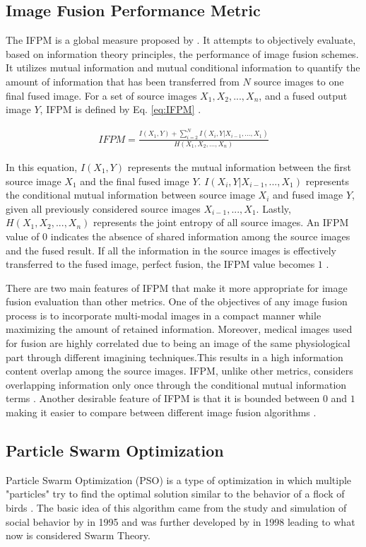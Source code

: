 \documentclass{article}
\begin{document}
\subsection{Image Fusion Performance Metric}
\label{subsection: IFPM}
The IFPM is a global measure proposed by \cite{ifpm}. It attempts to objectively evaluate, based on information theory principles, the performance of image fusion schemes. It utilizes mutual information and mutual conditional information to quantify the amount of information that has been transferred from $N$ source images to one final fused image. For a set of source images $X_1, X_2, ... , X_n$, and a fused output image $Y$, IFPM is defined by Eq. \ref{eq:IFPM} \cite{ifpm}.

\begin{gather}\label{eq:IFPM}
IFPM = \frac{I(X_1,Y) + \sum_{i=2}^{N} I(X_i,Y|X_{i-1},...,X_1)}{H(X_1,X_2,...,X_n)}
\end{gather}

In this equation, $I(X_1,Y)$ represents the mutual information between the first source image $X_1$ and the final fused image $Y$.
$I(X_i,Y|X_{i-1},...,X_1)$ represents the conditional mutual information between source image $X_i$ and fused image $Y$, given all previously considered source images $X_{i-1},...,X_1$. Lastly, $H(X_1,X_2,...,X_n)$ represents the joint entropy of all source images. An IFPM value of $0$ indicates the absence of shared information among the source images and the fused result. If all the information in the source images is effectively transferred to the fused image, perfect fusion, the IFPM value becomes $1$ \cite{ifpm}.

There are two main features of IFPM that make it more appropriate for image fusion evaluation than other metrics. One of the objectives of any image fusion process is to incorporate multi-modal images in a compact manner while maximizing the amount of retained information. Moreover, medical images used for fusion are highly correlated due to being an image of the same physiological part through different imagining techniques.This results in a high information content overlap among the source images. IFPM, unlike other metrics, considers overlapping information only once through the conditional mutual information terms \cite{ifpm}. Another desirable feature of IFPM is that it is bounded between $0$ and $1$ making it easier to compare between different image fusion algorithms \cite{ifpm}. 

\subsection{Particle Swarm Optimization}
Particle Swarm Optimization (PSO) is a type of optimization in which multiple "particles" try to find the optimal solution similar to the behavior of a flock of birds \cite{Shi.Eberhart.1998}. The basic idea of this algorithm came from the study and simulation of social behavior by \cite{Kennedy.Eberhart.1995} in 1995 and was further developed by \cite{Shi.Eberhart.1998} in 1998 leading to what now is considered Swarm Theory.
\end{document}
